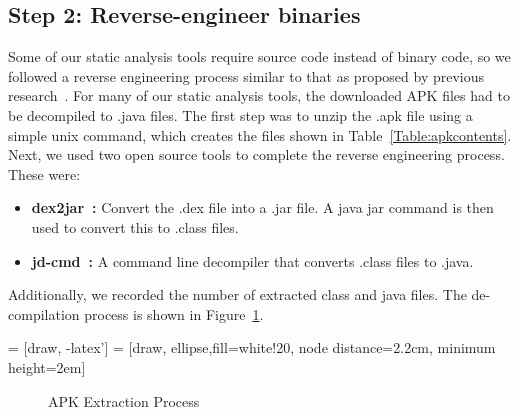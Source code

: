 \subsection{Step 2: Reverse-engineer binaries}
\label{sec: decompliation}
Some of our static analysis tools require source code instead of binary code, so we followed a reverse engineering process similar to that as proposed by previous research~\cite{Lee_2013,6687155}. For many of our static analysis tools, the downloaded APK files had to be decompiled to .java files. The first step was to unzip the .apk file using a simple unix command, which creates the files shown in Table~\ref{Table:apkcontents}. Next, we used two open source tools to complete the reverse engineering process. These were:

\begin{itemize}
  \item \textbf{dex2jar~\cite{dex2jar_key}:} Convert the .dex file into a .jar file. A java jar command is then used to convert this to .class files.
  \item \textbf{jd-cmd~\cite{jdcmd_key}:} A command line decompiler that converts .class files to .java.
\end{itemize}

Additionally, we recorded the number of extracted class and java files. The de-compilation process is shown in Figure~\ref{fig:extractionprocess}.




 = [draw, -latex']
 = [draw, ellipse,fill=white!20, node distance=2.2cm,
    minimum height=2em]

	\begin{figure}[h]
	\begin{center}
\label{fig:extractionprocess}
\caption{APK Extraction Process}
\end{center}
\end{figure}


